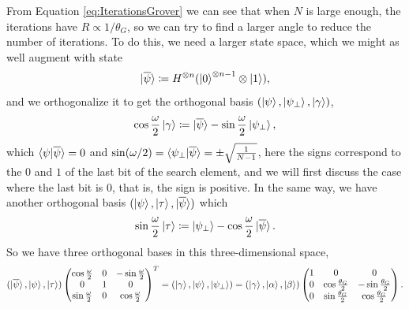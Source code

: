\documentclass[a4paper,10pt]{book}
\numberwithin{equation}{section}
\begin{document}
From Equation \ref{eq:IterationsGrover} we can see that when $N$ is large enough, the iterations have $R\propto 1/\theta_{G}$, so we can try to find a larger angle to reduce the number of iterations. To do this, we need a larger state space, which we might as well augment with state
\begin{equation}
    \ket{\overline{\psi}}\coloneqq H^{\otimes n}(\ket{0}^{\otimes n-1}\otimes\ket{1}),
\end{equation}
and we orthogonalize it to get the orthogonal basis $(\ket{\psi},\ket{\psi_{\perp}},\ket{\gamma})$,
\begin{equation}
    \cos\frac{\omega}{2}\ket{\gamma}\coloneqq \ket{\overline{\psi}}-\sin\frac{\omega}{2}\ket{\psi_{\perp}},
\end{equation}
which $\braket{\psi|\overline{\psi}}=0$ and $\sin(\omega/2)=\braket{\psi_{\perp}|\overline{\psi}}=\pm\sqrt{\frac{1}{N-1}}$, here the signs correspond to the $0$ and $1$ of the last bit of the search element, and we will first discuss the case where the last bit is $0$, that is, the sign is positive. In the same way, we have another orthogonal basis $(\ket{\psi},\ket{\tau},\ket{\overline{\psi}})$ which
\begin{equation}
    \sin\frac{\omega}{2}\ket{\tau}\coloneqq \ket{\psi_{\perp}}-\cos\frac{\omega}{2}\ket{\overline{\psi}}.
\end{equation}
So we have three orthogonal bases in this three-dimensional space,
\begin{equation*}
    (\ket{\overline{\psi}},\ket{\psi},\ket{\tau})
    \begin{pmatrix}
        \cos\frac{\omega}{2} & 0 & -\sin\frac{\omega}{2} \\
        0                    & 1 & 0                     \\
        \sin\frac{\omega}{2} & 0 & \cos\frac{\omega}{2}
    \end{pmatrix}
    ^{T}=(\ket{\gamma},\ket{\psi},\ket{\psi_{\perp}})
    =(\ket{\gamma},\ket{\alpha},\ket{\beta})
    \begin{pmatrix}
        1 & 0                        & 0                         \\
        0 & \cos\frac{\theta_{G}}{2} & -\sin\frac{\theta_{G}}{2} \\
        0 & \sin\frac{\theta_{G}}{2} & \cos\frac{\theta_{G}}{2}
    \end{pmatrix}
    .
\end{equation*}
\end{document}
